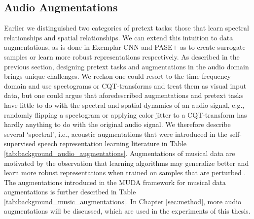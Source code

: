 \subsection{Audio Augmentations}\label{sec:audio_transformations}
Earlier we distinguished two categories of pretext tasks: those that learn spectral relationships and spatial relationships. We can extend this intuition to data augmentations, as is done in Exemplar-CNN \cite{dosovitskiy_discriminative_2014} and PASE$+$ \cite{Ravanelli2020} as to create surrogate samples or learn more robust representations respectively. As described in the previous section, designing pretext tasks and augmentations in the audio domain brings unique challenges. We reckon one could resort to the time-frequency domain and use spectograms or CQT-transforms and treat them as visual input data, but one could argue that aforedescribed augmentations and pretext tasks have little to do with the spectral and spatial dynamics of an audio signal, e.g., randomly flipping a spectogram or applying color jitter to a CQT-transform has hardly anything to do with the original audio signal. We therefore describe several `spectral', i.e., acoustic augmentations that were introduced in the self-supervised speech representation learning literature \cite{Ravanelli2020} in Table \ref{tab:background_audio_augmentations}. Augmentations of musical data are motivated by the observation that learning algorithms may generalize better and learn more robust representations when trained on samples that are perturbed \cite{Sturm2015}. The augmentations introduced in the MUDA framework for musical data augmentations is further described in Table \ref{tab:background_music_augmentations}. In Chapter \ref{sec:method}, more audio augmentations will be discussed, which are used in the experiments of this thesis.

